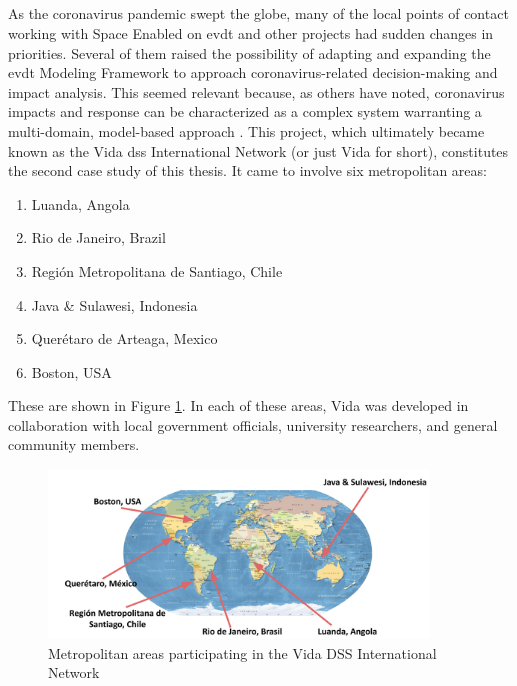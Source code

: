 \subsection{} \label{sec:vida-saf-method}

\subsubsection{}

As the coronavirus pandemic swept the globe, many of the local points of contact working with Space Enabled on \ac{evdt} and other projects had sudden changes in priorities. Several of them raised the possibility of adapting and expanding the \ac{evdt} Modeling Framework to approach coronavirus-related decision-making and impact analysis. This seemed relevant because, as others have noted, coronavirus impacts and response can be characterized as a complex system warranting a multi-domain, model-based approach \cite{deweckHandlingCOVID192020}. This project,  which ultimately became known as the Vida \ac{dss} International Network (or just Vida for short), constitutes the second case study of this thesis. It came to involve six metropolitan areas:

\begin{enumerate}[itemsep=0pt,parsep=0pt]
    \item{Luanda, Angola}
    \item Rio de Janeiro, Brazil
    \item Región Metropolitana de Santiago, Chile
    \item{Java \& Sulawesi, Indonesia}
    \item{Querétaro de Arteaga, Mexico}
    \item{Boston, USA}
\end{enumerate}

These are shown in Figure \ref{fig:vida_map}. In each of these areas, Vida was developed in collaboration with local government officials, university researchers, and general community members. 

\begin{figure}[h]
	\centering
	\includegraphics[width=0.9\textwidth]{Figures/chap5/vida_map.png}
	\caption{Metropolitan areas participating in the Vida DSS International Network}
	\label{fig:vida_map}
\end{figure}


